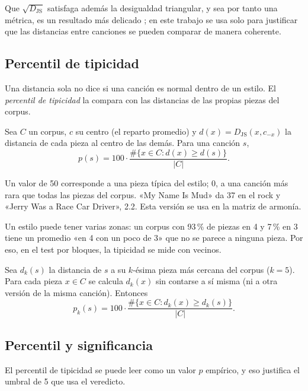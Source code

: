Que $\sqrt{D_{\mathrm{JS}}}$ satisfaga además la desigualdad triangular, y sea por tanto una métrica, es un resultado
más delicado \citep{endres2003}; en este trabajo se usa solo para justificar que las distancias entre canciones se pueden
comparar de manera coherente.

\subsection{Percentil de tipicidad}

Una distancia sola no dice si una canción es normal dentro de un estilo. El \emph{percentil de tipicidad} la compara con
las distancias de las propias piezas del corpus.

\begin{definicion}
Sea $C$ un corpus, $c$ su centro (el reparto promedio) y $d(x) = D_{\mathrm{JS}}(x, c_{-x})$ la distancia de cada pieza
al centro de las demás. Para una canción $s$,
\[
  p(s) = 100 \cdot \frac{\#\{x \in C : d(x) \ge d(s)\}}{|C|}.
\]
\end{definicion}

Un valor de 50 corresponde a una pieza típica del estilo; 0, a una canción más rara que todas las piezas del corpus.
«My Name Is Mud» da 37 en el rock y «Jerry Was a Race Car Driver», 2.2. Esta versión se usa en la matriz de armonía.

Un estilo puede tener varias zonas: un corpus con 93\,\% de piezas en 4 y 7\,\% en 3 tiene un promedio «en 4 con un poco
de 3» que no se parece a ninguna pieza. Por eso, en el test por bloques, la tipicidad se mide con vecinos.

\begin{definicion}
Sea $d_k(s)$ la distancia de $s$ a su $k$-ésima pieza más cercana del corpus ($k = 5$). Para cada pieza $x \in C$ se
calcula $d_k(x)$ sin contarse a sí misma (ni a otra versión de la misma canción). Entonces
\[
  p_k(s) = 100 \cdot \frac{\#\{x \in C : d_k(x) \ge d_k(s)\}}{|C|}.
\]
\end{definicion}

\subsection{Percentil y significancia}

El percentil de tipicidad se puede leer como un valor $p$ empírico, y eso justifica el umbral de 5 que usa el veredicto.

